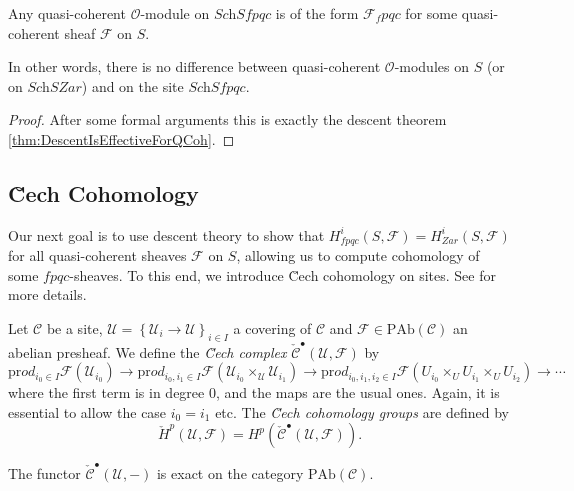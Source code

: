   \begin{theorem}
Any quasi-coherent $\mathcal{O}$-module on $\textit{Sch}Sfpqc$ is of the form $\mathcal{F}_fpqc$ for some quasi-coherent sheaf $\mathcal{F}$ on $S$. 
  \end{theorem}
  
In other words, there is no difference between quasi-coherent $\mathcal{O}$-modules on $S$ (or on $\textit{Sch}SZar$) and on the site $\textit{Sch}Sfpqc$.
  
\begin{proof} 
After some formal arguments this is exactly the descent theorem \ref{thm:DescentIsEffectiveForQCoh}.
\end{proof}
  
\subsection{\u Cech Cohomology}

Our next goal is to use descent theory to show that $H_{fpqc}^i(S, \mathcal{F}) = H_{Zar}^i(S, \mathcal{F})$ for all quasi-coherent  sheaves $\mathcal{F}$ on $S$, allowing us to compute cohomology of some $fpqc$-sheaves.  To this end, we introduce \u Cech cohomology on sites. See \cite{Artin} for more details.
 
\begin{definition} 
Let $\mathcal{C}$ be a site, $\mathcal{U}=\left\{\mathcal{U}_i\to \mathcal{U}\right\}_{i\in I}$ a covering of $\mathcal{C}$ and $\mathcal{F}\in \text{PAb}(\mathcal{C})$ an abelian presheaf. We define the \emph{\u Cech complex} $\check{\mathcal{C}}^\bullet(\mathcal{U}, \mathcal{F})$ by 
$$ 
 \text{pr}od_{i_0\in I}\mathcal{F}(\mathcal{U}_{i_0}) \to \text{pr}od_{i_0, i_1\in I}\mathcal{F}\left(\mathcal{U}_{i_0}\times_{\mathcal{U}} \mathcal{U}_{i_1}\right) \to \text{pr}od_{i_0, i_1, i_2 \in I} \mathcal{F}\left(U_{i_0}\times_U U_{i_1} \times_U U_{i_2}\right) \to \cdots
$$
where the first term is in degree 0, and the maps are the usual ones. Again, it is essential to allow the case $i_0 = i_1$ etc. The \emph{\u Cech cohomology groups} are defined by
$$
\check{H}^p(\mathcal{U}, \mathcal{F})= H^p(\check{\mathcal{C}}^\bullet\left(\mathcal{U}, \mathcal{F}\right)).
$$
\end{definition}

\begin{lemma} 
The functor $\check{\mathcal{C}}^\bullet(\mathcal{U}, -)$ is exact on the category $\text{PAb}(\mathcal{C})$. 
\end{lemma}	
  
